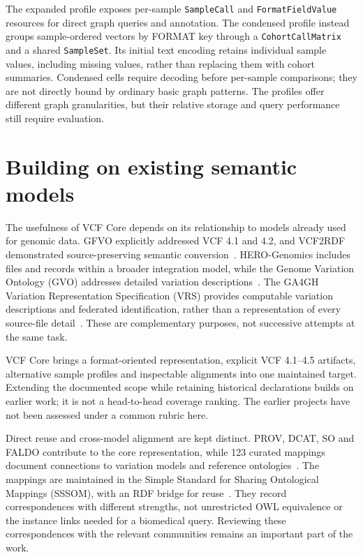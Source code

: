 \documentclass{ceurart}
\newcommand{\term}[1]{\texttt{#1}}
\begin{document}
The expanded profile exposes per-sample \term{SampleCall} and \term{FormatFieldValue} resources for direct graph queries and annotation.
The condensed profile instead groups sample-ordered vectors by FORMAT key through a \term{CohortCallMatrix} and a shared \term{SampleSet}.
Its initial text encoding retains individual sample values, including missing values, rather than replacing them with cohort summaries.
Condensed cells require decoding before per-sample comparisons; they are not directly bound by ordinary basic graph patterns.
The profiles offer different graph granularities, but their relative storage and query performance still require evaluation.

\section{Building on existing semantic models}
\label{sec:alignments}

The usefulness of VCF Core depends on its relationship to models already used for genomic data.
GFVO explicitly addressed VCF 4.1 and 4.2, and VCF2RDF demonstrated source-preserving semantic conversion~\cite{baran2015gfvo,penha2017vcf2rdf}.
HERO-Genomics includes files and records within a broader integration model, while the Genome Variation Ontology (GVO) addresses detailed variation descriptions~\cite{cazzaro2025hero,kawashima2023gvo}.
The GA4GH Variation Representation Specification (VRS) provides computable variation descriptions and federated identification, rather than a representation of every source-file detail~\cite{wagner2021vrs}.
These are complementary purposes, not successive attempts at the same task.

VCF Core brings a format-oriented representation, explicit VCF 4.1--4.5 artifacts, alternative sample profiles and inspectable alignments into one maintained target.
Extending the documented scope while retaining historical declarations builds on earlier work; it is not a head-to-head coverage ranking.
The earlier projects have not been assessed under a common rubric here.

Direct reuse and cross-model alignment are kept distinct.
PROV, DCAT, SO and FALDO contribute to the core representation, while 123 curated mappings document connections to variation models and reference ontologies~\cite{vcfc210}.
The mappings are maintained in the Simple Standard for Sharing Ontological Mappings (SSSOM), with an RDF bridge for reuse~\cite{matentzoglu2022sssom}.
They record correspondences with different strengths, not unrestricted OWL equivalence or the instance links needed for a biomedical query.
Reviewing these correspondences with the relevant communities remains an important part of the work.
\end{document}
